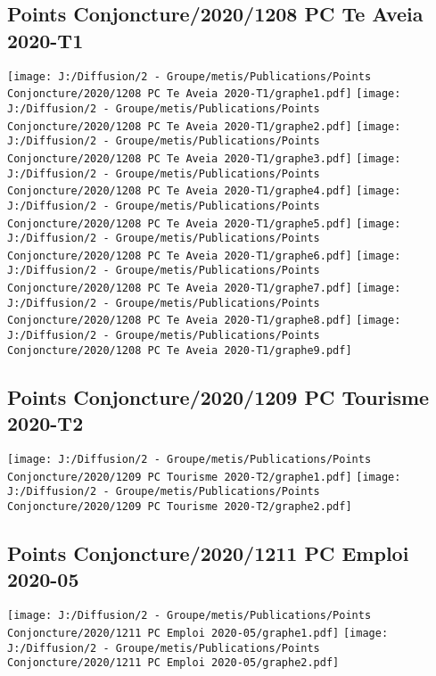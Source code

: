 \documentclass[
]{article}
\begin{document}
\hypertarget{points-conjoncture20201208-pc-te-aveia-2020-t1}{%
\subsection{Points Conjoncture/2020/1208 PC Te Aveia
2020-T1}\label{points-conjoncture20201208-pc-te-aveia-2020-t1}}

\texttt{[image: J:/Diffusion/2 - Groupe/metis/Publications/Points Conjoncture/2020/1208 PC Te Aveia 2020-T1/graphe1.pdf]}
\texttt{[image: J:/Diffusion/2 - Groupe/metis/Publications/Points Conjoncture/2020/1208 PC Te Aveia 2020-T1/graphe2.pdf]}
\texttt{[image: J:/Diffusion/2 - Groupe/metis/Publications/Points Conjoncture/2020/1208 PC Te Aveia 2020-T1/graphe3.pdf]}
\texttt{[image: J:/Diffusion/2 - Groupe/metis/Publications/Points Conjoncture/2020/1208 PC Te Aveia 2020-T1/graphe4.pdf]}
\texttt{[image: J:/Diffusion/2 - Groupe/metis/Publications/Points Conjoncture/2020/1208 PC Te Aveia 2020-T1/graphe5.pdf]}
\texttt{[image: J:/Diffusion/2 - Groupe/metis/Publications/Points Conjoncture/2020/1208 PC Te Aveia 2020-T1/graphe6.pdf]}
\texttt{[image: J:/Diffusion/2 - Groupe/metis/Publications/Points Conjoncture/2020/1208 PC Te Aveia 2020-T1/graphe7.pdf]}
\texttt{[image: J:/Diffusion/2 - Groupe/metis/Publications/Points Conjoncture/2020/1208 PC Te Aveia 2020-T1/graphe8.pdf]}
\texttt{[image: J:/Diffusion/2 - Groupe/metis/Publications/Points Conjoncture/2020/1208 PC Te Aveia 2020-T1/graphe9.pdf]}

\hypertarget{points-conjoncture20201209-pc-tourisme-2020-t2}{%
\subsection{Points Conjoncture/2020/1209 PC Tourisme
2020-T2}\label{points-conjoncture20201209-pc-tourisme-2020-t2}}

\texttt{[image: J:/Diffusion/2 - Groupe/metis/Publications/Points Conjoncture/2020/1209 PC Tourisme 2020-T2/graphe1.pdf]}
\texttt{[image: J:/Diffusion/2 - Groupe/metis/Publications/Points Conjoncture/2020/1209 PC Tourisme 2020-T2/graphe2.pdf]}

\hypertarget{points-conjoncture20201211-pc-emploi-2020-05}{%
\subsection{Points Conjoncture/2020/1211 PC Emploi
2020-05}\label{points-conjoncture20201211-pc-emploi-2020-05}}

\texttt{[image: J:/Diffusion/2 - Groupe/metis/Publications/Points Conjoncture/2020/1211 PC Emploi 2020-05/graphe1.pdf]}
\texttt{[image: J:/Diffusion/2 - Groupe/metis/Publications/Points Conjoncture/2020/1211 PC Emploi 2020-05/graphe2.pdf]}
\end{document}
